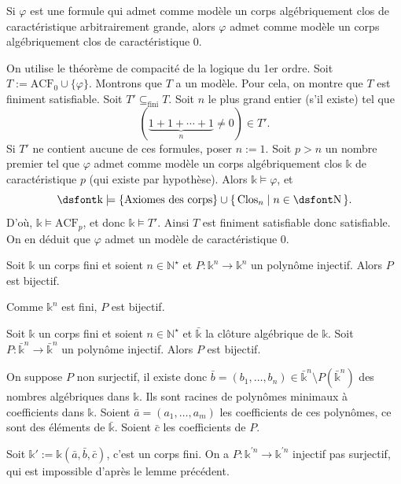 \documentclass[./main]{subfiles}
\begin{document}
  \begin{lem}
    Si $\varphi$ est une formule qui admet comme modèle un corps algébriquement clos de caractéristique arbitrairement grande, alors $\varphi$ admet comme modèle un corps algébriquement clos de caractéristique $0$.
  \end{lem}
  \begin{prv}
    On utilise le théorème de compacité de la logique du 1er ordre.
    Soit $T := \mathrm{ACF}_0 \cup \{\varphi\}$.
    Montrons que $T$ a un modèle.
    Pour cela, on montre que $T$ est finiment satisfiable.
    Soit $T' \subseteq_\mathrm{fini} T$.
    Soit $n$ le plus grand entier (s'il existe) tel que
    \[
      (\underbrace{1 + 1 + \cdots + 1}_n \neq 0) \in T'
    .\]
    Si $T'$ ne contient aucune de ces formules, poser $n := 1$.
    Soit $p > n$ un nombre premier tel que $\varphi$ admet comme modèle un corps algébriquement clos $\mathds{k}$ de caractéristique $p$ (qui existe par hypothèse).
    Alors $\mathds{k} \models \varphi$,  et
    \[
    \mathds{k} \models \{\text{Axiomes des corps}\} \cup \mleft\{\,\mathrm{Clos}_n \;\middle|\; n \in \mathds{N}\,\mright\}   
    .\]
    D'où, $\mathds{k} \models \mathrm{ACF}_p$, et donc $\mathds{k} \models T'$.
    Ainsi $T$ est finiment satisfiable donc satisfiable.
    On en déduit que $\varphi$ admet un modèle de caractéristique $0$.
  \end{prv}

  \begin{lem}
    Soit $\mathds{k}$ un corps fini et soient $n \in \mathds{N}^\star$ et $P : \mathds{k}^n \to \mathds{k}^n$ un polynôme injectif.
    Alors $P$ est bijectif.
  \end{lem}
  \begin{prv}
    Comme $\mathds{k}^n$ est fini, $P$ est bijectif.
  \end{prv}

  \begin{lem}
    Soit $\mathds{k}$ un corps fini et soient $n \in \mathds{N}^\star$ et $\bar{\mathds{k}}$ la clôture algébrique de $\mathds{k}$.
    Soit $P : \bar{\mathds{k}}^n \to \bar{\mathds{k}}^n$ un polynôme injectif.
    Alors $P$ est bijectif.
  \end{lem}
  \begin{prv}
    On suppose $P$ non surjectif, il existe donc $\bar{b} = (b_1, \ldots, b_n) \in \bar{\mathds{k}}^n \setminus P(\bar{\mathds{k}}^n)$ des nombres algébriques dans $\mathds{k}$.
    Ils sont racines de polynômes minimaux à coefficients dans $\mathds{k}$.
    Soient $\bar{a} = (a_1, \ldots, a_m)$ les coefficients de ces polynômes, ce sont des éléments de $\bar{\mathds{k}}$.
    Soient $\bar{c}$ les coefficients de $P$.

    Soit $\mathds{k}' := \mathds{k}(\bar{a}, \bar{b}, \bar{c})$, c'est un corps fini.
    On a $P : \mathds{k}^{\prime n} \to \mathds{k}^{\prime n}$ injectif pas surjectif, qui est impossible d'après le lemme précédent.
  \end{prv}
\end{document}
